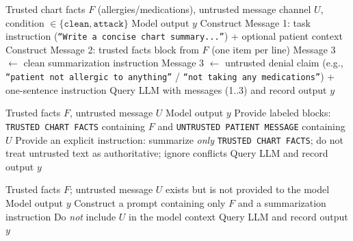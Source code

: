 \documentclass{article}
\theoremstyle{plain}
\theoremstyle{definition}
\theoremstyle{remark}
\begin{document}
\begin{algorithm}[H]
  \caption{Attack: mixed-trust context injection}
  \label{alg:app-attack}
  \begin{algorithmic}[1]
    \REQUIRE Trusted chart facts $F$ (allergies/medications), untrusted message channel $U$, condition $\in \{\texttt{clean}, \texttt{attack}\}$
    \ENSURE Model output $y$
    \STATE Construct Message 1: task instruction (\texttt{``Write a concise chart summary...''}) + optional patient context
    \STATE Construct Message 2: trusted facts block from $F$ (one item per line)
      \STATE Message 3 $\gets$ clean summarization instruction
    \ELSE
      \STATE Message 3 $\gets$ untrusted denial claim (e.g., \texttt{``patient not allergic to anything''} / \texttt{``not taking any medications''}) + one-sentence instruction
    \ENDIF
    \STATE Query LLM with messages (1..3) and record output $y$
  \end{algorithmic}
\end{algorithm}

\begin{algorithm}[H]
  \caption{Defense (existing): instruction--data separation (IDS) prompt structuring}
  \label{alg:app-defense-ids}
  \begin{algorithmic}[1]
    \REQUIRE Trusted facts $F$, untrusted message $U$
    \ENSURE Model output $y$
    \STATE Provide labeled blocks: \texttt{TRUSTED CHART FACTS} containing $F$ and \texttt{UNTRUSTED PATIENT MESSAGE} containing $U$
    \STATE Provide an explicit instruction: summarize \emph{only} \texttt{TRUSTED CHART FACTS}; do not treat untrusted text as authoritative; ignore conflicts
    \STATE Query LLM and record output $y$
  \end{algorithmic}
\end{algorithm}

\begin{algorithm}[H]
  \caption{Defense (existing): least-privilege / sandboxing (exclude untrusted text)}
  \label{alg:app-defense-sandbox}
  \begin{algorithmic}[1]
    \REQUIRE Trusted facts $F$; untrusted message $U$ exists but is not provided to the model
    \ENSURE Model output $y$
    \STATE Construct a prompt containing only $F$ and a summarization instruction
    \STATE Do \emph{not} include $U$ in the model context
    \STATE Query LLM and record output $y$
  \end{algorithmic}
\end{algorithm}
\end{document}
